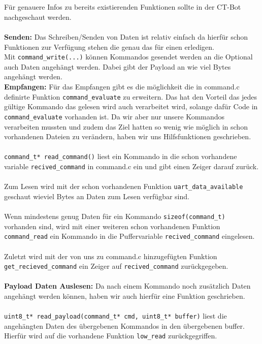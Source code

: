  \newpage


 \\
\\
Für genauere Infos zu bereits existierenden Funktionen sollte in der CT-Bot nachgeschaut werden.\\
\\
\textbf{Senden:} Das Schreiben/Senden von Daten ist relativ einfach da hierfür schon Funktionen zur Verfügung stehen die genau das für einen erledigen.\\
Mit \verb|command_write(...)| können Kommandos gesendet werden an die Optional auch Daten angehängt werden. Dabei gibt der Payload an wie viel Bytes angehängt werden. 
\\
\textbf{Empfangen:} Für das Empfangen gibt es die möglichkeit die in command.c definirte Funktion \verb|command_evaluate| zu erweitern. Das hat den Vorteil das jedes gültige Kommando das gelesen wird auch verarbeitet wird, solange dafür Code in \verb|command_evaluate| vorhanden ist.
Da wir aber nur unsere Kommandos verarbeiten mussten und zudem das Ziel hatten so wenig wie möglich in schon vorhandenen Dateien zu verändern, haben wir uns Hilfsfunktionen geschrieben.\\
\\
\verb|command_t* read_command()| liest ein Kommando in die schon vorhandene variable \verb|recived_command| in command.c ein und gibt einen Zeiger darauf zurück.\\
\\
Zum Lesen wird mit der schon vorhandenen Funktion \verb|uart_data_available| geschaut wieviel Bytes an Daten zum Lesen verfügbar sind.\\
\\
Wenn mindestens genug Daten für ein Kommando \verb|sizeof(command_t)| vorhanden sind, wird mit einer weiteren schon vorhandenen Funktion \verb|command_read| ein Kommando in die Puffervariable \verb|recived_command| eingelesen.\\
\\
Zuletzt wird mit der von uns zu command.c hinzugefügten Funktion \\
\verb|get_recieved_command| ein Zeiger auf \verb|recived_command| zurückgegeben.\\
\\
\textbf{Payload Daten Auslesen:} Da nach einem Kommando noch zusätzlich Daten angehängt werden können, haben wir auch hierfür eine Funktion geschrieben.\\
\\
\verb|uint8_t* read_payload(command_t* cmd, uint8_t* buffer)| liest die angehängten Daten des übergebenen Kommandos in den übergebenen buffer.\\ Hierfür wird auf die vorhandene Funktion \verb|low_read| zurückgegriffen.

